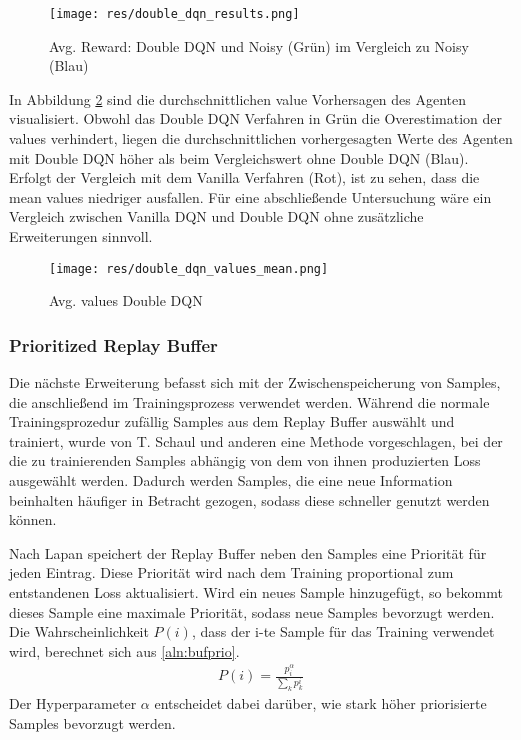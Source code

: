 \documentclass[11pt]{scrartcl}
\begin{document}
\begin{figure}[htp]
\centering
\texttt{[image: res/double\_dqn\_results.png]}
\caption{Avg. Reward: Double DQN und Noisy (Grün) im Vergleich zu Noisy (Blau)}
\label{fig:double-dqn}
\end{figure}

In Abbildung \ref{fig:double-dqn-value-mean} sind die durchschnittlichen value Vorhersagen
des Agenten visualisiert. Obwohl das Double DQN Verfahren in Grün die Overestimation der
values verhindert, liegen die durchschnittlichen vorhergesagten Werte des Agenten mit
Double DQN höher als beim Vergleichswert ohne Double DQN (Blau). Erfolgt der Vergleich mit
dem Vanilla Verfahren (Rot), ist zu sehen, dass die mean values niedriger ausfallen. Für
eine abschließende Untersuchung wäre ein Vergleich zwischen Vanilla DQN und Double DQN
ohne zusätzliche Erweiterungen sinnvoll.

\begin{figure}[htp]
  \centering
  \texttt{[image: res/double\_dqn\_values\_mean.png]}
  \caption{Avg. values Double DQN}
  \label{fig:double-dqn-value-mean}
\end{figure}

\subsubsection{Prioritized Replay Buffer}
Die nächste Erweiterung befasst sich mit der Zwischenspeicherung von Samples, die
anschließend im Trainingsprozess verwendet werden. Während die normale Trainingsprozedur
zufällig Samples aus dem Replay Buffer auswählt und trainiert, wurde von T. Schaul und
anderen \cite{schaul2015prioritized} eine Methode vorgeschlagen, bei der die zu
trainierenden Samples abhängig von dem von ihnen produzierten Loss ausgewählt werden.
Dadurch werden Samples, die eine neue Information beinhalten häufiger in Betracht
gezogen, sodass diese schneller genutzt werden können.

Nach Lapan \cite[~S. 282]{L2018} speichert der Replay Buffer neben den Samples eine
Priorität für jeden Eintrag. Diese Priorität wird nach dem Training proportional zum
entstandenen Loss aktualisiert. Wird ein neues Sample hinzugefügt, so bekommt dieses
Sample eine maximale Priorität, sodass neue Samples bevorzugt werden. Die
Wahrscheinlichkeit $P(i)$, dass der i-te Sample für das Training verwendet wird, berechnet
sich aus \autoref{aln:bufprio}.
\begin{align}
  P(i) = \frac{p_i^\alpha}{\sum_k p_k^i}
\label{aln:bufprio}
\end{align}
\noindent
Der Hyperparameter $\alpha$ entscheidet dabei darüber, wie stark höher priorisierte
Samples bevorzugt werden.
\end{document}
